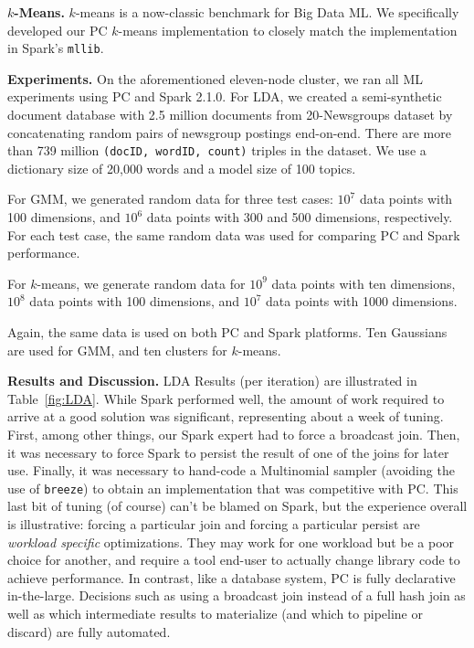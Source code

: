 \vspace{5pt}
\noindent
\textbf{$k$-Means.} $k$-means is a now-classic
benchmark for Big Data ML.  We specifically developed our PC $k$-means implementation to closely match
the implementation in Spark's \texttt{mllib}.

\vspace{5pt}
\noindent
\textbf {Experiments.} On the aforementioned eleven-node cluster, 
we ran all ML experiments using PC and Spark 2.1.0.
For LDA,  we
created a semi-synthetic document database with 2.5 million documents from
20-Newsgroups dataset by concatenating random pairs of newsgroup postings
end-on-end. There are more than 739
million \texttt{(docID, wordID, count)} triples in the dataset.
We use a dictionary size
of 20,000 words and a model size of 100 topics. 

For GMM, we generated
random data for three test cases: $10^7$ data
points with 100 dimensions, and $10^6$ data points with 300 and 500
dimensions, respectively. For each test case, the same random data was used
for comparing PC and Spark performance. 

For $k$-means, we
generate random data for $10^9$ data
points with ten dimensions, $10^8$ data points with 100 dimensions,  and $10^7$
data points with 1000
dimensions. 



Again, the same data is used on both PC and
Spark platforms.
Ten Gaussians are used for GMM, and ten clusters for $k$-means.

\vspace{5pt}
\noindent
\textbf {Results and Discussion.} LDA Results (per iteration) are
illustrated in Table~\ref{fig:LDA}. While Spark performed well, the 
amount of work required to arrive at a good solution 
was significant, representing about a week of tuning.  First, among other things, our Spark expert had to force a 
broadcast join.  Then, it was necessary to force Spark to
persist the result of one of the joins for later use.  Finally, it was necessary to hand-code a 
Multinomial sampler (avoiding the use of \texttt{breeze}) to obtain an implementation that was competitive with PC.
This last bit of tuning (of course) can't be blamed on Spark, but the experience overall is illustrative: forcing 
a particular join and forcing a particular persist are \emph{workload specific} optimizations.  They may work for one
workload but be a poor choice for another, and require a tool end-user to actually change library code to achieve
performance.  In contrast, like a database system, PC is fully declarative in-the-large.
Decisions such as using a broadcast join instead of a full hash
join as well as which intermediate results to materialize (and which to pipeline or discard) are fully automated.

